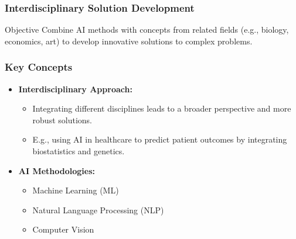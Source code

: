 \documentclass[aspectratio=169]{beamer}
\begin{document}
\begin{frame}[fragile]
    \frametitle{Interdisciplinary Solution Development}
    \begin{block}{Objective}
        Combine AI methods with concepts from related fields (e.g., biology, economics, art) to develop innovative solutions to complex problems.
    \end{block}
\end{frame}

\begin{frame}[fragile]
    \frametitle{Key Concepts}
    \begin{itemize}
        \item \textbf{Interdisciplinary Approach:} 
        \begin{itemize}
            \item Integrating different disciplines leads to a broader perspective and more robust solutions.
            \item E.g., using AI in healthcare to predict patient outcomes by integrating biostatistics and genetics.
        \end{itemize}
        \item \textbf{AI Methodologies:} 
        \begin{itemize}
            \item Machine Learning (ML)
            \item Natural Language Processing (NLP)
            \item Computer Vision
        \end{itemize}
    \end{itemize}
\end{frame}
\end{document}

